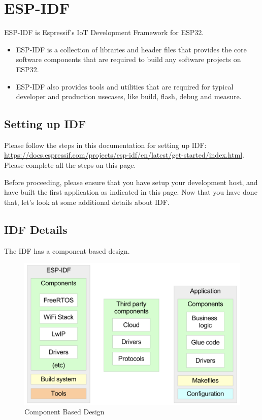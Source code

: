 \documentclass[main.tex]{subfiles}
\begin{document}
\section{ESP-IDF}

ESP-IDF is Espressif's IoT Development Framework for ESP32. 
\begin{itemize}
    \item ESP-IDF is a collection of libraries and header files that provides the core software components that are required to build any software projects on ESP32. 
    \item ESP-IDF also provides tools and utilities that are required for typical developer and production usecases, like build, flash, debug and measure.
\end{itemize}

\subsection{Setting up IDF}

Please follow the steps in this documentation for setting up IDF: \url{https://docs.espressif.com/projects/esp-idf/en/latest/get-started/index.html}. Please complete all the steps on this page.

Before proceeding, please ensure that you have setup your development host, and have built the first application as indicated in this page. Now that you have done that, let's look at some additional details about IDF.

\subsection{IDF Details}

The IDF has a component based design.

\begin{figure}[h!]
    \centering
    \includegraphics[width=\textwidth]{../../_static/idf_comp.png}
    \caption{Component Based Design}
    \label{fig:idf_comp_design}
\end{figure}
\end{document}
